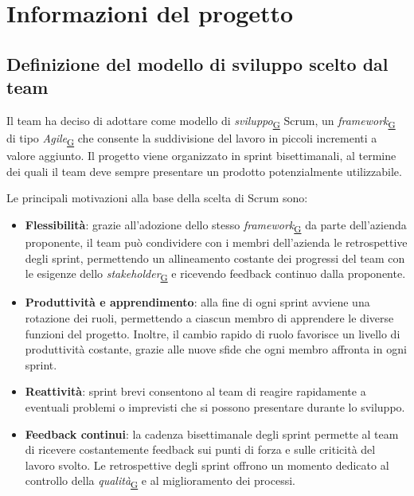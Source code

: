 \documentclass[a4paper,12pt]{article}
\begin{document}
\section{Informazioni del progetto}{


    \subsection{Definizione del modello di sviluppo scelto dal team}
        Il team ha deciso di adottare come modello di \textit{sviluppo}\textsubscript{\href{https://atlasteam9.github.io/Atlas/glossario.html\#Sviluppo}{G}} Scrum, un \textit{framework}\textsubscript{\href{https://atlasteam9.github.io/Atlas/glossario.html\#Framework}{G}} di tipo \textit{Agile}\textsubscript{\href{https://atlasteam9.github.io/Atlas/glossario.html\#Agile}{G}} che consente la suddivisione del lavoro in piccoli incrementi a valore aggiunto.
        Il progetto viene organizzato in sprint bisettimanali, al termine dei quali il team deve sempre presentare un prodotto potenzialmente utilizzabile.

        Le principali motivazioni alla base della scelta di Scrum sono:

        \begin{itemize}
        \item \textbf{Flessibilità}: grazie all'adozione dello stesso \textit{framework}\textsubscript{\href{https://atlasteam9.github.io/Atlas/glossario.html\#Framework}{G}} da parte dell'azienda proponente, il team può condividere con i membri dell'azienda
            le retrospettive degli sprint, permettendo un allineamento costante dei progressi del team con le esigenze dello \textit{stakeholder}\textsubscript{\href{https://atlasteam9.github.io/Atlas/glossario.html\#Stakeholder}{G}} e ricevendo feedback continuo dalla proponente.
        \item \textbf{Produttività e apprendimento}: alla fine di ogni sprint avviene una rotazione dei ruoli, permettendo a ciascun membro di apprendere le diverse funzioni del 
            progetto. Inoltre, il cambio rapido di ruolo favorisce un livello di produttività costante, grazie alle nuove sfide che ogni membro affronta in ogni sprint.
        \item \textbf{Reattività}: sprint brevi consentono al team di reagire rapidamente a eventuali problemi o imprevisti che si possono presentare durante lo sviluppo.
        \item \textbf{Feedback continui}: la cadenza bisettimanale degli sprint permette al team di ricevere costantemente feedback sui punti di forza e sulle criticità 
            del lavoro svolto. Le retrospettive degli sprint offrono un momento dedicato al controllo della \textit{qualità}\textsubscript{\href{https://atlasteam9.github.io/Atlas/glossario.html\#Qualità}{G}} e al miglioramento dei processi.
        \end{itemize}
    
}
\end{document}
